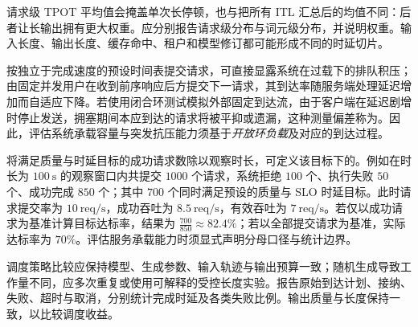 \documentclass[../textbook.tex]{subfiles}
\begin{document}
请求级 TPOT 平均值会掩盖单次长停顿，也与把所有 ITL 汇总后的均值不同：后者让长输出拥有更大权重。应分别报告请求级分布与词元级分布，并说明权重。输入长度、输出长度、缓存命中、租户和模型修订都可能形成不同的时延切片。

按独立于完成速度的预设时间表提交请求，可直接显露系统在过载下的排队积压；由固定并发用户在收到前序响应后方提交下一请求，其到达率随服务端处理延迟增加而自适应下降。若使用闭合环测试模拟外部固定到达流，由于客户端在延迟剧增时停止发送，拥塞期间本应到达的请求将被平抑或遗漏，这种测量偏差称为。因此，评估系统承载容量与突发抗压能力须基于\emph{开放环负载}及对应的到达过程。

将满足质量与时延目标的成功请求数除以观察时长，可定义该目标下的。例如在时长为 $\qty{100}{\second}$ 的观察窗口内共提交 $1000$ 个请求，系统拒绝 $100$ 个、执行失败 $50$ 个、成功完成 $850$ 个；其中 $700$ 个同时满足预设的质量与 SLO 时延目标。此时请求提交率为 $\qty{10}{\text{req}/\second}$，成功吞吐为 $\qty{8.5}{\text{req}/\second}$，有效吞吐为 $\qty{7}{\text{req}/\second}$。若仅以成功请求为基准计算目标达标率，结果为 $\frac{700}{850} \approx 82.4\%$；若以全部提交请求为基准，实际达标率为 $70\%$。评估服务承载能力时须显式声明分母口径与统计边界。

调度策略比较应保持模型、生成参数、输入轨迹与输出预算一致；随机生成导致工作量不同，应多次重复或使用可解释的受控长度实验。报告原始到达计划、接纳、失败、超时与取消，分别统计完成时延及各类失败比例。输出质量与长度保持一致，以比较调度收益。




\chapterreferences
\myendchapterdocument
\end{document}
